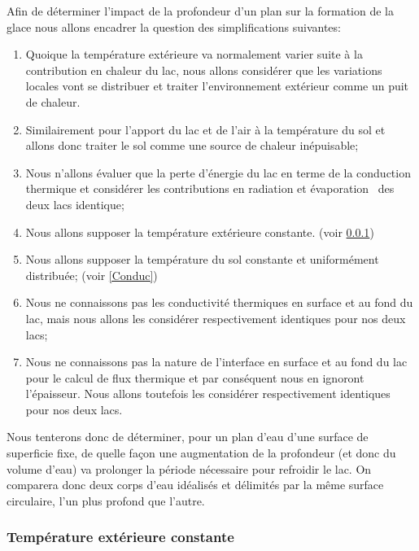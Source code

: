 \documentclass[12pt]{article}
\numberwithin{figure}{section}
\begin{document}
Afin de d\'eterminer l'impact de la profondeur d'un plan sur la formation de la glace nous allons
encadrer la question des simplifications suivantes:

\begin{enumerate}
    \item Quoique la temp\'erature ext\'erieure va normalement varier suite \`a la contribution
        en chaleur du lac, nous allons consid\'erer que les variations locales vont se distribuer
        et traiter l'environnement ext\'erieur comme un puit de chaleur.
    \item Similairement pour l'apport du lac et de l'air \`a la temp\'erature du sol et allons
        donc traiter le sol comme une source de chaleur in\'epuisable;
    \item Nous n'allons \'evaluer que la perte d'\'energie du lac en terme de la conduction thermique
        et consid\'erer les contributions en radiation et \'evaporation~\cite{Evap} des deux lacs
        identique;
    \item Nous allons supposer la temp\'erature ext\'erieure constante. (voir \ref{TempExt})
    \item Nous allons supposer la temp\'erature du sol constante et uniform\'ement distribu\'ee;
        (voir \ref{Conduc})
    \item Nous ne connaissons pas les conductivit\'e thermiques en surface et au fond du lac, mais
        nous allons les consid\'erer respectivement identiques pour nos deux lacs;
    \item Nous ne connaissons pas la nature de l'interface en surface et au fond du lac pour le
        calcul de flux thermique et par cons\'equent nous en ignoront l'\'epaisseur. Nous allons
        toutefois les consid\'erer respectivement identiques pour nos deux lacs.
\end{enumerate}

Nous tenterons donc de d\'eterminer, pour un plan d'eau d'une surface de superficie fixe, de quelle fa\c
con une augmentation de la profondeur (et donc du volume d'eau) va prolonger la p\'eriode n\'ecessaire
pour refroidir le lac. On comparera donc deux corps d'eau id\'ealis\'es et d\'elimit\'es par la m\^eme
surface circulaire, l'un plus profond que l'autre.

\subsubsection{Temp\'erature ext\'erieure constante}\label{TempExt}
\end{document}
